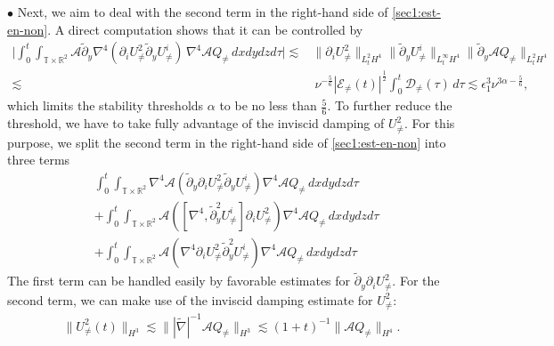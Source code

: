 \documentclass[11pt,reqno]{article}
\numberwithin{equation}{section}
\newcommand\R{{\mathbb R}}
\newcommand\T{{\mathbb T}}
\newcommand\D{{\mathcal D}}
\newcommand\E{{\mathcal E}}
\newcommand\A{\mathcal{A}}
\newcommand\uu{\bm{u}}
\newcommand \tri {\coloneqq}
\let\pa=\partial
\let\na=\nabla
\let\al=\alpha
\let\f=\frac
\let\ep=\epsilon
\begin{document}
$\bullet$ Next, we aim to deal with the second term in the right-hand side of \eqref{sec1:est-en-non}.
A direct computation shows that it can be controlled by 
\begin{align*}
    \Big|\int_0^t\int_{\T\times\R^2} \A\tilde{\pa}_y\nabla^4(\pa_{i}U_{\not=}^2\tilde{\pa}_yU_{\not=}^i)\, \nabla^4\A Q_{\not=}\,dxdydzd\tau \Big|
\lesssim& \|\pa_i U_{\neq}^2\|_{L_t^2H^4}\|\tilde{\pa}_yU_{\not=}^i\|_{L_t^{\infty}H^4}
\|\tilde{\pa}_y \A Q_{\neq}\|_{L_t^2H^4}
\\
\lesssim&~ \nu^{-\f56} |\E_{\not=}(t)|^{\f12} \int_0^t\D_{\not=}(\tau)\,d\tau
\lesssim  \ep_1^3\nu^{3\al-\f56},
\end{align*}
which limits the stability thresholds $\alpha$ to be no less than $\frac56$.
To further reduce the threshold, we have to take fully advantage of the inviscid damping of $U_{\neq}^2.$ 
For this purpose, we split the second term in the right-hand side of \eqref{sec1:est-en-non} into three terms
\begin{align*}
	&\int_0^t\int_{\T\times\R^2}	\nabla^4\A(\tilde{\pa}_y\pa_{i}U_{\not=}^2\tilde{\pa}_yU_{\not=}^i) 
	\nabla^4\A Q_{\not=}\,dxdydzd\tau
	\nonumber
	\\
	&+
	\int_0^t\int_{\T\times\R^2}
	\A([\nabla^4,\tilde{\pa}_y^2U_{\not=}^i]\pa_{i}U_{\not=}^2) 
	\nabla^4\A Q_{\not=}\,dxdydzd\tau
	\nonumber
	\\
	&+
	\int_0^t\int_{\T\times\R^2}
	\A(\nabla^4\pa_{i}U_{\not=}^2
	\tilde{\pa}_y^2U_{\not=}^i)
	\nabla^4\A Q_{\not=}\,dxdydzd\tau 
	\nonumber
\end{align*}
The first term can be handled easily by favorable estimates for $\tilde{\pa}_y\pa_{i}U_{\not=}^2.$ For the second term, we can make use of the inviscid damping estimate for $U_{\neq}^2:$
\begin{align}\label{U2-damp-intr}
    \|U_{\neq}^2(t)\|_{H^3}\lesssim \||\tilde{\na}|^{-1}\A Q_{\neq}\|_{H^3}\lesssim (1+t)^{-1}\|\A Q_{\neq}\|_{H^4}.
\end{align}
\end{document}
